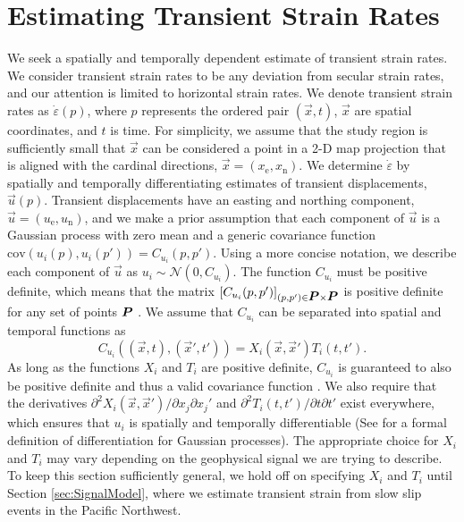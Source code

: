 \documentclass[extra,mreferee]{gji}
\begin{document}
\section{Estimating Transient Strain Rates}\label{sec:Method}
We seek a spatially and temporally dependent estimate of transient strain rates. We consider transient strain rates to be any deviation from secular strain rates, and our attention is limited to horizontal strain rates. We denote transient strain rates as $\dot\varepsilon(p)$, where $p$ represents the ordered pair $(\vec{x},t)$, $\vec{x}$ are spatial coordinates, and $t$ is time. For simplicity, we assume that the study region is sufficiently small that $\vec{x}$ can be considered a point in a 2-D map projection that is aligned with the cardinal directions, $\vec{x} = (x_\mathrm{e},x_\mathrm{n})$. We determine $\dot\varepsilon$ by spatially and temporally differentiating estimates of transient displacements, $\vec{u}(p)$. Transient displacements have an easting and northing component, $\vec{u} = (u_\mathrm{e}, u_\mathrm{n})$, and we make a prior assumption that each component of $\vec{u}$ is a Gaussian process with zero mean and a generic covariance function $\mathrm{cov}\left(u_i(p),u_i(p')\right) = C_{u_i}(p,p')$. Using a more concise notation, we describe each component of $\vec{u}$ as $u_i \sim \mathcal{N}\left(0,C_{u_i}\right)$. The function $C_{u_i}$ must be positive definite, which means that the matrix $[C_{u_i}(p,p')]_{(p,p') \in \mitbf{P} \times \mitbf{P}}$ is positive definite for any set of points $\mitbf{P}$ \citep[sec. 2.5]{Cressie1992}. We assume that $C_{u_i}$ can be separated into spatial and temporal functions as 
\begin{equation}\label{eq:TransientCovariance}
C_{u_i}\left((\vec{x},t),(\vec{x}',t')\right) = X_i(\vec{x},\vec{x}')T_i(t,t').
\end{equation}  
As long as the functions $X_i$ and $T_i$ are positive definite, $C_{u_i}$ is guaranteed to also be positive definite and thus a valid covariance function \citep[sec. 4.2.4]{Rasmussen2006}. We also require that the derivatives $\partial^2 X_i(\vec{x},\vec{x}')/ \partial x_j \partial x_j'$ and $\partial^2 T_i(t,t') / \partial t \partial t'$ exist everywhere, which ensures that $u_i$ is spatially and temporally differentiable (See \citet[sec. 2.2]{Adler1981} for a formal definition of differentiation for Gaussian processes). The appropriate choice for $X_i$ and $T_i$ may vary depending on the geophysical signal we are trying to describe.  To keep this section sufficiently general, we hold off on specifying $X_i$ and $T_i$ until Section \ref{sec:SignalModel}, where we estimate transient strain from slow slip events in the Pacific Northwest. 
\end{document}
